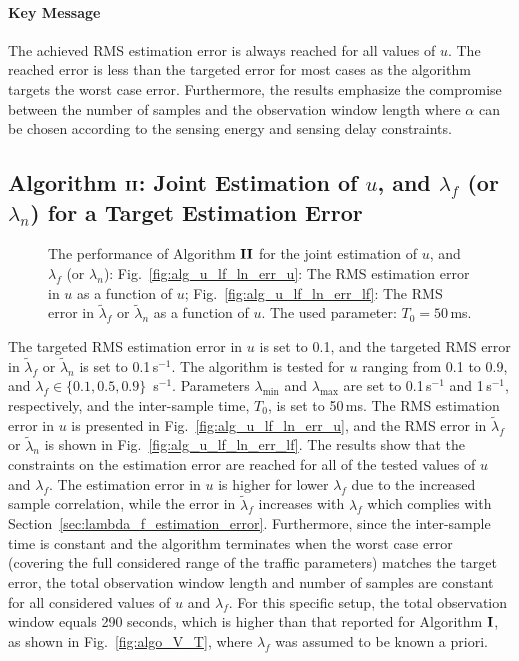 \documentclass[11pt,draftclsnofoot,journal,onecolumn]{IEEEtran}
\begin{document}
\paragraph*{Key Message}

The achieved RMS estimation error is always reached for all values of $u$. The reached error is less than the targeted error for most cases as the algorithm targets the worst case error. Furthermore, the results emphasize the compromise between the number of samples and the observation window length where $\alpha$ can be chosen according to the sensing energy and sensing delay constraints.

\subsection{Algorithm $\bf{II}$: Joint Estimation of $u$, and $\lambda_f$ (or $\lambda_n$) for a Target Estimation Error}
\label{sec:algorithm_numerical_u_lf_ln}

\begin{figure}
\centering
{}
\caption{The performance of Algorithm $\bf{II}$ for the joint estimation of $u$, and $\lambda_f$ (or $\lambda_n$): Fig.~\ref{fig:alg_u_lf_ln_err_u}: The RMS estimation error in $u$ as a function of $u$; Fig.~\ref{fig:alg_u_lf_ln_err_lf}: The RMS error in $\tilde{\lambda}_f$ or $\tilde{\lambda}_n$ as a function of $u$. The used parameter: $T_0=50$\,ms.}
\end{figure}

The targeted RMS estimation error in $u$ is set to 0.1, and the targeted RMS error in $\tilde{\lambda}_f$ or $\tilde{\lambda}_n$ is set to 0.1\,s$^{-1}$. The algorithm is tested for $u$ ranging from 0.1 to 0.9, and $\lambda_f \in \{0.1,0.5,0.9\}$\, s$^{-1}$. Parameters $\lambda_{\min}$ and $\lambda_{\max}$ are set to 0.1\,s$^{-1}$ and 1\,s$^{-1}$, respectively, and the inter-sample time, $T_0$, is set to 50\,ms. The RMS estimation error in $u$ is presented in Fig.~\ref{fig:alg_u_lf_ln_err_u}, and the RMS error in $\tilde{\lambda}_f$ or $\tilde{\lambda}_n$ is shown in Fig.~\ref{fig:alg_u_lf_ln_err_lf}. The results show that the constraints on the estimation error are reached for all of the tested values of $u$ and $\lambda_f$. The estimation error in $u$ is higher for lower $\lambda_f$ due to the increased sample correlation, while the error in $\tilde{\lambda}_f$ increases with $\lambda_f$ which complies with Section~\ref{sec:lambda_f_estimation_error}. Furthermore, since the inter-sample time is constant and the algorithm terminates when the worst case error (covering the full considered range of the traffic parameters) matches the target error, the total observation window length and number of samples are constant for all considered values of $u$ and $\lambda_f$. For this specific setup, the total observation window equals 290 seconds, which is higher than that reported for Algorithm $\bf{I}$, as shown in Fig.~\ref{fig:algo_V_T}, where $\lambda_f$ was assumed to be known a priori.
\end{document}
